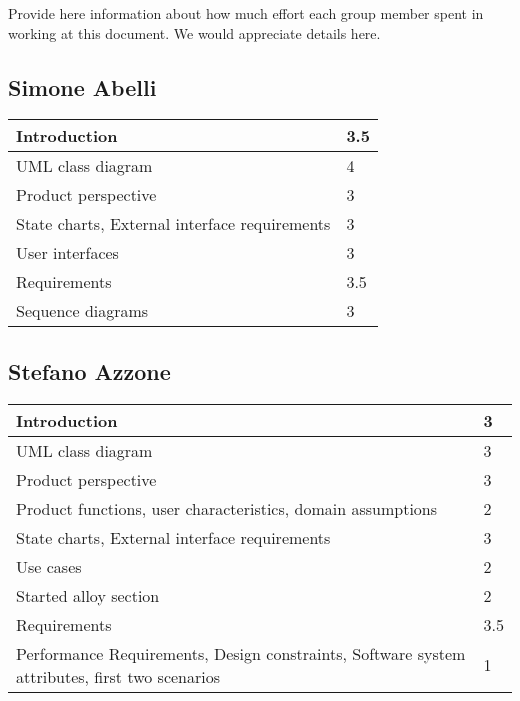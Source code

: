 Provide here information about how much effort each group member spent in working at this document. We would appreciate details here.\\

\subsection{Simone Abelli}
\begin{tabular} { | m{5cm} | m{1cm} | }
	\hline
	Introduction & 3.5\\
	\hline
	UML class diagram & 4\\
	\hline
	Product perspective & 3\\
	\hline
	State charts, External interface requirements & 3\\
	\hline
	User interfaces & 3\\
	\hline
	Requirements & 3.5\\
	\hline
	Sequence diagrams & 3\\
	\hline
\end{tabular}

\subsection{Stefano Azzone}
\begin{tabular} { | m{5cm} | m{1cm} | }
	\hline
	Introduction & 3\\
	\hline
	UML class diagram & 3\\
	\hline
	Product perspective & 3\\
	\hline
	Product functions, user characteristics, domain assumptions & 2\\
	\hline
	State charts, External interface requirements & 3\\
	\hline
	Use cases & 2\\
	\hline
	Started alloy section & 2\\
	\hline
	Requirements & 3.5\\
	\hline
	Performance Requirements, Design constraints, Software system attributes, first two scenarios & 1\\
	\hline
\end{tabular}